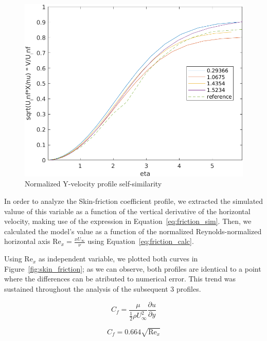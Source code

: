 \documentclass[12pt]{article}
\begin{document}
        \begin{figure}[ht!]
                \centering
                \includegraphics[width=\textwidth]{v_collapsed.png}
                \caption{Normalized Y-velocity profile self-similarity}
                \label{fig:v_similarity}
        \end{figure}

        In order to analyze the Skin-friction coefficient profile, we extracted the simulated valuue of this variable as a function of the vertical derivative of the horizontal velocity, making use of the expression in Equation~\ref{eq:friction_sim}. Then, we calculated the model's value as a function of the normalized Reynolds-normalized horizontal axis \( \text{Re}_x = \frac{x U_\infty}{\nu} \) using Equation~\ref{eq:friction_calc}.
        
        Using \( \text{Re}_x \) as independent variable, we plotted both curves in Figure~\ref{fig:skin_friction}; as we can observe, both profiles are identical to a point where the differences can be atributed to numerical error. This trend was sustained throughout the analysis of the subsequent 3 profiles.

        \begin{equation} \label{eq:friction_sim}
                C_f = \frac{\mu}{\frac{1}{2} \rho U_\infty^2} \frac{\partial u}{\partial y}
        \end{equation}

        \begin{equation} \label{eq:friction_calc}
                C_f = 0.664 \sqrt{\text{Re}_x} 
        \end{equation}
\end{document}
